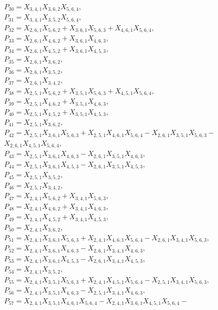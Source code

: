 \documentclass[10pt]{beamer}
\begin{document}
{$P_{30}=X_{3,4,1}X_{3,6,2}X_{5,6,4},$\\
$P_{31}=X_{3,4,1}X_{3,5,2}X_{5,6,4},$\\
$P_{32}=X_{2,6,1}X_{5,6,2}+X_{3,6,1}X_{5,6,3}+X_{4,6,1}X_{5,6,4},$\\
$P_{33}=X_{2,6,1}X_{4,6,2}+X_{3,6,1}X_{4,6,3},$\\
$P_{34}=X_{2,6,1}X_{4,5,2}+X_{3,6,1}X_{4,5,3},$\\
$P_{35}=X_{2,6,1}X_{3,6,2},$\\
$P_{36}=X_{2,6,1}X_{3,5,2},$\\
$P_{37}=X_{2,6,1}X_{3,4,2},$\\
$P_{38}=X_{2,5,1}X_{5,6,2}+X_{3,5,1}X_{5,6,3}+X_{4,5,1}X_{5,6,4},$\\
$P_{39}=X_{2,5,1}X_{4,6,2}+X_{3,5,1}X_{4,6,3},$\\
$P_{40}=X_{2,5,1}X_{4,5,2}+X_{3,5,1}X_{4,5,3},$\\
$P_{41}=X_{2,5,1}X_{3,6,2},$\\
$P_{42}=X_{2,5,1}X_{3,6,1}X_{5,6,3}+X_{2,5,1}X_{4,6,1}X_{5,6,4}-X_{2,6,1}X_{3,5,1}X_{5,6,3}-$\\
$X_{2,6,1}X_{4,5,1}X_{5,6,4},$\\
$P_{43}=X_{2,5,1}X_{3,6,1}X_{4,6,3}-X_{2,6,1}X_{3,5,1}X_{4,6,3},$\\
$P_{44}=X_{2,5,1}X_{3,6,1}X_{4,5,3}-X_{2,6,1}X_{3,5,1}X_{4,5,3},$\\
$P_{45}=X_{2,5,1}X_{3,5,2},$\\
$P_{46}=X_{2,5,1}X_{3,4,2},$\\
$P_{47}=X_{2,4,1}X_{5,6,2}+X_{3,4,1}X_{5,6,3},$\\
$P_{48}=X_{2,4,1}X_{4,6,2}+X_{3,4,1}X_{4,6,3},$\\
$P_{49}=X_{2,4,1}X_{4,5,2}+X_{3,4,1}X_{4,5,3},$\\
$P_{50}=X_{2,4,1}X_{3,6,2},$\\
$P_{51}=X_{2,4,1}X_{3,6,1}X_{5,6,3}+X_{2,4,1}X_{4,6,1}X_{5,6,4}-X_{2,6,1}X_{3,4,1}X_{5,6,3},$\\
$P_{52}=X_{2,4,1}X_{3,6,1}X_{4,6,3}-X_{2,6,1}X_{3,4,1}X_{4,6,3},$\\
$P_{53}=X_{2,4,1}X_{3,6,1}X_{4,5,3}-X_{2,6,1}X_{3,4,1}X_{4,5,3},$\\
$P_{54}=X_{2,4,1}X_{3,5,2},$\\
$P_{55}=X_{2,4,1}X_{3,5,1}X_{5,6,3}+X_{2,4,1}X_{4,5,1}X_{5,6,4}-X_{2,5,1}X_{3,4,1}X_{5,6,3},$\\
$P_{56}=X_{2,4,1}X_{3,5,1}X_{4,6,3}-X_{2,5,1}X_{3,4,1}X_{4,6,3},$\\
$P_{57}=X_{2,4,1}X_{3,5,1}X_{4,6,1}X_{5,6,4}-X_{2,4,1}X_{3,6,1}X_{4,5,1}X_{5,6,4}-$\\
}
\end{document}
